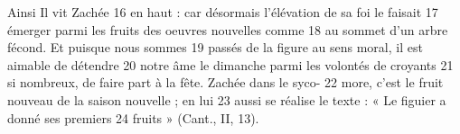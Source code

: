 Ainsi Il vit Zachée	 
16	 	en haut : car désormais l'élévation de sa foi le faisait	 
17	 	émerger parmi les fruits des oeuvres nouvelles comme	 
18	 	au sommet d'un arbre fécond. Et puisque nous sommes	 
19	 	passés de la figure au sens moral, il est aimable de détendre	 
20	 	notre âme le dimanche parmi les volontés de croyants	 
21	 	si nombreux, de faire part à la fête. Zachée dans le syco-	 
22	 	more, c'est le fruit nouveau de la saison nouvelle ; en lui	 
23	 	aussi se réalise le texte : « Le figuier a donné ses premiers	 
24	 	fruits » (Cant., II, 13).